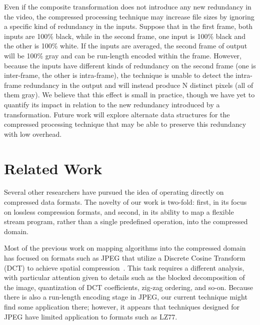 Even if the composite transformation does not introduce any new
redundancy in the video, the compressed processing technique may
increase file sizes by ignoring a specific kind of redundancy in the
inputs.  Suppose that in the first frame, both inputs are 100\% black,
while in the second frame, one input is 100\% black and the other is
100\% white.  If the inputs are averaged, the second frame of output
will be 100\% gray and can be run-length encoded within the frame.
However, because the inputs have different kinds of redundancy on the
second frame (one is inter-frame, the other is intra-frame), the
technique is unable to detect the intra-frame redundancy in the output
and will instead produce N distinct pixels (all of them gray).  We
believe that this effect is small in practice, though we have yet to
quantify its impact in relation to the new redundancy introduced by a
transformation.  Future work will explore alternate data structures
for the compressed processing technique that may be able to preserve
this redundancy with low overhead.

\section{Related Work}
\label{sec:related}

Several other researchers have pursued the idea of operating directly
on compressed data formats.  The novelty of our work is two-fold:
first, in its focus on lossless compression formats, and second, in
its ability to map a flexible stream program, rather than a single
predefined operation, into the compressed domain.

Most of the previous work on mapping algorithms into the compressed
domain has focused on formats such as JPEG that utilize a Discrete
Cosine Transform (DCT) to achieve spatial
compression~\cite{smith98,dorai00,dugad01,feng03,mukherjee02,nang00,shen96,shen96b,shen98,smith96b,vasudev98}.
This task requires a different analysis, with particular attention
given to details such as the blocked decomposition of the image,
quantization of DCT coefficients, zig-zag ordering, and so-on.
Because there is also a run-length encoding stage in JPEG, our current
technique might find some application there; however, it appears that
techniques designed for JPEG have limited application to formats such
as LZ77.  

